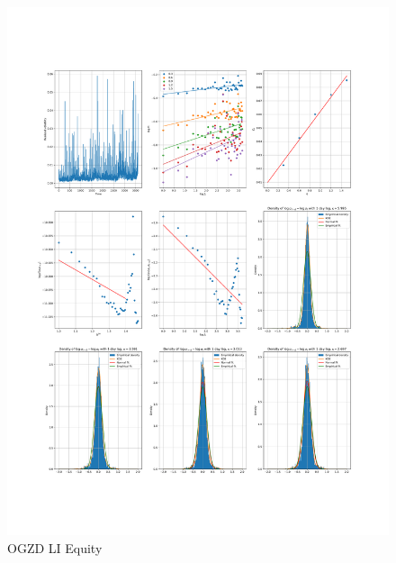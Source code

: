     \begin{figure}[h]
        \includegraphics[width=\textwidth]{fig/OGZD LI Equity.pdf}
        \caption{OGZD LI Equity}
    \end{figure} 
        
